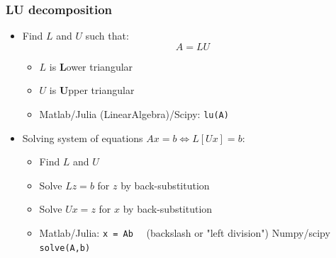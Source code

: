 \documentclass[bigger]{beamer}
\begin{document}
\begin{frame}

\frametitle{LU decomposition}

\begin{itemize}
\item Find $L$ and $U$ such that: 
\begin{equation*}
A=LU
\end{equation*}

\begin{itemize}
\item $L$ is \textbf{L}ower triangular

\item $U$ is \textbf{U}pper triangular

\item Matlab/Julia (LinearAlgebra)/Scipy: \texttt{lu(A)}
\end{itemize}

\item Solving system of equations $Ax=b\Leftrightarrow L[Ux]=b$:

\begin{itemize}
\item Find $L$ and $U$

\item Solve $Lz=b$ for $z$ by back-substitution

\item Solve $Ux=z$ for $x$ by back-substitution

\item Matlab/Julia: \texttt{x = A\TEXTsymbol{\backslash}b} \ \ (backslash or "left
division") Numpy/scipy \texttt{solve(A,b)}
\end{itemize}
\end{itemize}


\end{frame}%
\end{document}
